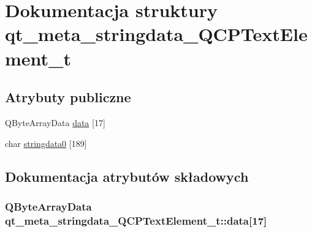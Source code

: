 \hypertarget{structqt__meta__stringdata___q_c_p_text_element__t}{}\section{Dokumentacja struktury qt\+\_\+meta\+\_\+stringdata\+\_\+\+Q\+C\+P\+Text\+Element\+\_\+t}
\label{structqt__meta__stringdata___q_c_p_text_element__t}
\subsection*{Atrybuty publiczne}
\begin{DoxyCompactItemize}
\item 
Q\+Byte\+Array\+Data \hyperlink{structqt__meta__stringdata___q_c_p_text_element__t_aea7ed3e03af38c139400f8c837a108bf}{data} \mbox{[}17\mbox{]}
\item 
char \hyperlink{structqt__meta__stringdata___q_c_p_text_element__t_a7307363ad48472f7f131b7b59640d43b}{stringdata0} \mbox{[}189\mbox{]}
\end{DoxyCompactItemize}


\subsection{Dokumentacja atrybutów składowych}
\subsubsection[{\texorpdfstring{data}{data}}]{\setlength{\rightskip}{0pt plus 5cm}Q\+Byte\+Array\+Data qt\+\_\+meta\+\_\+stringdata\+\_\+\+Q\+C\+P\+Text\+Element\+\_\+t\+::data\mbox{[}17\mbox{]}}\hypertarget{structqt__meta__stringdata___q_c_p_text_element__t_aea7ed3e03af38c139400f8c837a108bf}{}\label{structqt__meta__stringdata___q_c_p_text_element__t_aea7ed3e03af38c139400f8c837a108bf}
